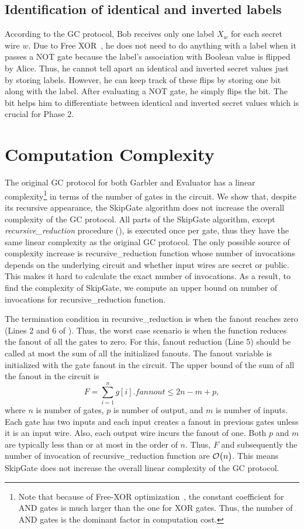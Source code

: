 \subsection{Identification of identical and inverted labels} According to the GC protocol, Bob receives only one label $X_w$ for each secret wire $w$.
Due to Free XOR~\cite{kolesnikov2008improved}, he does not need to do anything with a label when it passes a NOT gate because the label's association with Boolean value is flipped by Alice.
Thus, he cannot tell apart an identical and inverted secret values just by storing labels.
However, he can keep track of these flips by storing one bit along with the label.
After evaluating a NOT gate, he simply flips the bit.
The bit helps him to differentiate between identical and inverted secret values which is crucial for Phase 2.

\section{Computation Complexity}\label{ssec:skipgate_complexity}
The original GC protocol for both Garbler and Evaluator has a linear complexity\footnote{Note that because of Free-XOR optimization~\cite{kolesnikov2008improved}, the constant coefficient for AND gates is much larger than the one for XOR gates.
Thus, the number of AND gates is the dominant factor in computation cost.} in terms of the number of gates in the circuit.
We show that, despite its recursive appearance, the SkipGate algorithm does not increase the overall complexity of the GC protocol.
All parts of the SkipGate algorithm, except \textit{recursive\_reduction} procedure (), is executed once per gate, thus they have the same linear complexity as the original GC protocol.
The only possible source of complexity increase is recursive\_reduction function whose number of invocations depends on the underlying circuit and whether input wires are secret or public.
This makes it hard to calculate the exact number of invocations.
As a result, to find the complexity of SkipGate, we compute an upper bound on number of invocations for recursive\_reduction function.

The termination condition in recursive\_reduction is when the fanout reaches zero (Lines 2 and 6 of ).
Thus, the worst case scenario is when the function reduces the fanout of all the gates to zero.
For this, fanout reduction (Line 5) should be called at most the sum of all the initialized fanouts.
The fanout variable is initialized with the gate fanout in the circuit.
The upper bound of the sum of all the fanout in the circuit is $$F = \sum_{i=1}^{n} g[i].fannout \le 2n - m + p,$$ where $n$ is number of gates, $p$ is number of output,  and $m$ is number of inputs.
Each gate has two inputs and each input creates a fanout in previous gates unless it is an input wire.
Also, each output wire incurs the fanout of one.
Both $p$ and $m$ are typically less than or at most in the order of $n$.
Thus, $F$ and subsequently the number of invocation of recursive\_reduction function are $\mathcal{O}\bigl(n\bigr)$.
This means SkipGate does not increase the overall linear complexity of the GC protocol.

